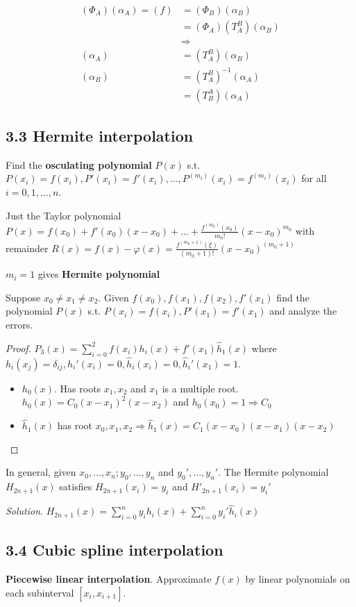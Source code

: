 \documentclass[11pt]{article}
\begin{document}
\begin{align*}
(\Phi_A)(\alpha_A)=(f)&=(\Phi_B)(\alpha_B)\\
&=(\Phi_A)(T_A^B)(\alpha_B)\\
&\Rightarrow\\
(\alpha_A)&=(T_A^B)(\alpha_B)\\
(\alpha_B)&=(T_A^B)^{-1}(\alpha_A)\\
&=(T_B^A)(\alpha_A)
\end{align*}
\subsection{3.3 Hermite interpolation}
\label{sec:org1e8546e}
Find the \textbf{osculating polynomial} \(P(x)\) s.t. \(P(x_i)=f(x_i),
   P'(x_i)=f'(x_i),\dots,P^{(m_i)}(x_i)=f^{(m_i)}(x_i)\) for all \(i=0,1,\dots,n\).

Just the Taylor polynomial \(P(x)=f(x_0)+f'(x_0)(x-x_0)+\dots+
   \frac{f^{(m_0)}(x_0)}{m_0!}(x-x_0)^{m_0}\) with remainder 
\(R(x)=f(x)-\varphi(x)=\frac{f^{(m_0+1)}(\xi)}{(m_0+1)!}(x-x_0)^{(m_0+1)}\)

\(m_i = 1\) gives \textbf{Hermite polynomial}

\begin{example}
Suppose $x_0\neq x_1\neq x_2$. Given $f(x_0),f(x_1), f(x_2),
f'(x_1)$ find the polynomial $P(x)$ s.t. $P(x_i)=f(x_i),P'(x_1)=f'(x_1)$ and
analyze the errors.
\end{example}

\begin{proof}
$P_3(x)=\displaystyle\sum_{i=0}^2f(x_i)h_i(x)+f'(x_1)\hat{h}_1(x)$ where
$h_i(x_j)=\delta_{ij},h_i'(x_i)=0,\hat{h}_i(x_i)=0,\hat{h}_i'(x_1)=1$.
\begin{itemize}
\item $h_0(x)$. Has roots $x_1,x_2$ and $x_1$ is a multiple root.
      $h_0(x)=C_0(x-x_1)^2(x-x_2)$ and $h_0(x_0)=1\Longrightarrow C_0$
\item $\hat{h}_1(x)$ has root $x_0,x_1,x_2\Longrightarrow 
      \hat{h}_1(x)=C_1(x-x_0)(x-x_1)(x-x_2)$
\end{itemize}
\end{proof}

In general, given \(x_0,\dots,x_n;y_0,\dots,y_n\) and \(y_0',\dots,y_n'\). The
Hermite polynomial \(H_{2n+1}(x)\) satisfies \(H_{2n+1}(x_i)=y_i\) and
\(H'_{2n+1}(x_i)=y_i'\) 

\emph{Solution}.
\(H_{2n+1}(x)=\displaystyle\sum_{i=0}^ny_ih_i(x)+\displaystyle\sum_{i=0}^ny_i'
   \hat{h}_i(x)\)
\subsection{3.4 Cubic spline interpolation}
\label{sec:orgc1a1b56}
\textbf{Piecewise linear interpolation}. Approximate \(f(x)\) by linear polynomials on
each subinterval \([x_i,x_{i+1}]\).
\end{document}
